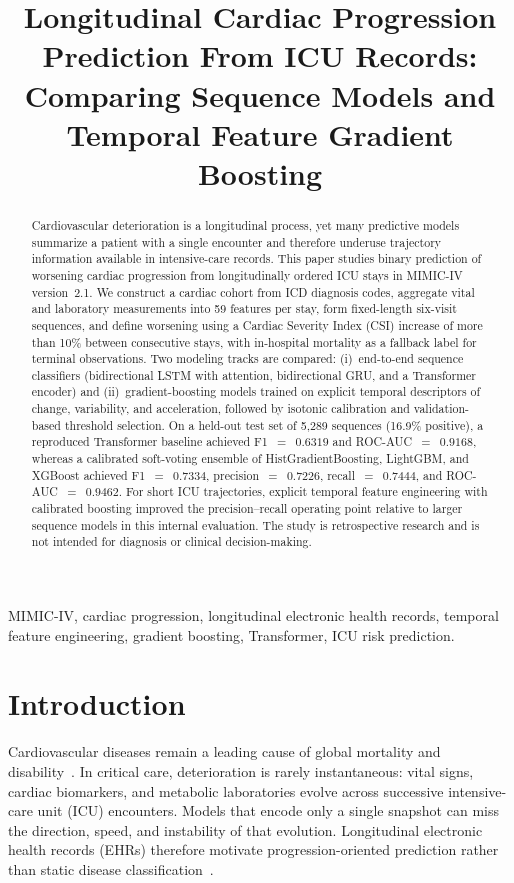 \documentclass[conference]{IEEEtran}
\title{Longitudinal Cardiac Progression Prediction From ICU Records: Comparing Sequence Models and Temporal Feature Gradient Boosting}
\author{\IEEEauthorblockN{H~M~Akshay,
Hemanth~Kumar~K,
Shreya~G,
Venkat~Baba~Yemineni,
and Padmasree~N}
\IEEEauthorblockA{RV Institute of Technology and Management (RVITM)\\
Visvesvaraya Technological University (VTU), Bengaluru, India}}
\begin{document}
\maketitle

\begin{abstract}
Cardiovascular deterioration is a longitudinal process, yet many predictive models summarize a patient with a single encounter and therefore underuse trajectory information available in intensive-care records. This paper studies binary prediction of worsening cardiac progression from longitudinally ordered ICU stays in MIMIC-IV version~2.1. We construct a cardiac cohort from ICD diagnosis codes, aggregate vital and laboratory measurements into 59 features per stay, form fixed-length six-visit sequences, and define worsening using a Cardiac Severity Index (CSI) increase of more than 10\% between consecutive stays, with in-hospital mortality as a fallback label for terminal observations. Two modeling tracks are compared: (i)~end-to-end sequence classifiers (bidirectional LSTM with attention, bidirectional GRU, and a Transformer encoder) and (ii)~gradient-boosting models trained on explicit temporal descriptors of change, variability, and acceleration, followed by isotonic calibration and validation-based threshold selection. On a held-out test set of 5{,}289 sequences (16.9\% positive), a reproduced Transformer baseline achieved F1~$=$~$0.6319$ and ROC-AUC~$=$~$0.9168$, whereas a calibrated soft-voting ensemble of HistGradientBoosting, LightGBM, and XGBoost achieved F1~$=$~$0.7334$, precision~$=$~$0.7226$, recall~$=$~$0.7444$, and ROC-AUC~$=$~$0.9462$. For short ICU trajectories, explicit temporal feature engineering with calibrated boosting improved the precision--recall operating point relative to larger sequence models in this internal evaluation. The study is retrospective research and is not intended for diagnosis or clinical decision-making.
\end{abstract}

\begin{IEEEkeywords}
MIMIC-IV, cardiac progression, longitudinal electronic health records, temporal feature engineering, gradient boosting, Transformer, ICU risk prediction.
\end{IEEEkeywords}

\section{Introduction}
Cardiovascular diseases remain a leading cause of global mortality and disability~\cite{roth2020gbd}. In critical care, deterioration is rarely instantaneous: vital signs, cardiac biomarkers, and metabolic laboratories evolve across successive intensive-care unit (ICU) encounters. Models that encode only a single snapshot can miss the direction, speed, and instability of that evolution. Longitudinal electronic health records (EHRs) therefore motivate progression-oriented prediction rather than static disease classification~\cite{choi2016doctorai,harutyunyan2019mimic,rajkomar2018ehr}.
\end{document}

